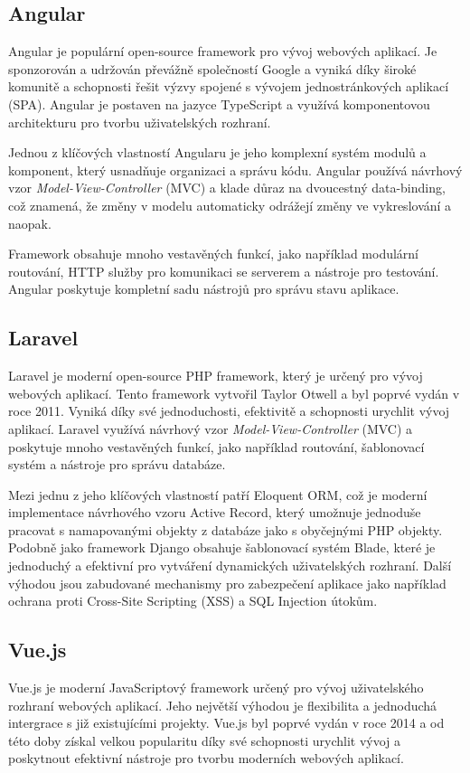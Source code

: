 \subsection{Angular}
\label{subsec:dev-framework-angular}
Angular je populární open-source framework pro vývoj webových aplikací. Je sponzorován a udržován převážně společností Google a vyniká díky široké komunitě a schopnosti řešit výzvy spojené s vývojem jednostránkových aplikací (SPA). Angular je postaven na jazyce TypeScript a využívá komponentovou architekturu pro tvorbu uživatelských rozhraní.

Jednou z klíčových vlastností Angularu je jeho komplexní systém modulů a komponent, který usnadňuje organizaci a správu kódu. Angular používá návrhový vzor \textit{Model-View-Controller} (MVC) a klade důraz na dvoucestný data-binding, což znamená, že změny v modelu automaticky odrážejí změny ve vykreslování a naopak.

Framework obsahuje mnoho vestavěných funkcí, jako například modulární routování, HTTP služby pro komunikaci se serverem a nástroje pro testování. Angular poskytuje kompletní sadu nástrojů pro správu stavu aplikace. \cite{about_angular}

\subsection{Laravel}
\label{subsec:dev-framework-laravel}
Laravel je moderní open-source PHP framework, který je určený pro vývoj webových aplikací. Tento framework vytvořil Taylor Otwell a byl poprvé vydán v roce 2011. Vyniká díky své jednoduchosti, efektivitě a schopnosti urychlit vývoj aplikací. Laravel využívá návrhový vzor \textit{Model-View-Controller} (MVC) a poskytuje mnoho vestavěných funkcí, jako například routování, šablonovací systém a nástroje pro správu databáze.

Mezi jednu z jeho klíčových vlastností patří Eloquent ORM, což je moderní implementace návrhového vzoru Active Record, který umožnuje jednoduše pracovat s namapovanými objekty z databáze jako s obyčejnými PHP objekty. Podobně jako framework Django obsahuje šablonovací systém Blade, které je jednoduchý a efektivní pro vytváření dynamických uživatelských rozhraní. Další výhodou jsou zabudované mechanismy pro zabezpečení aplikace jako například ochrana proti Cross-Site Scripting (XSS) a SQL Injection útokům. \cite{about_laravel}

\subsection{Vue.js}
\label{subsec:dev-framework-vuejs}
Vue.js je moderní JavaScriptový framework určený pro vývoj uživatelského rozhraní webových aplikací. Jeho největší výhodou je flexibilita a jednoduchá intergrace s již existujícími projekty. Vue.js byl poprvé vydán v roce 2014 a od této doby získal velkou popularitu díky své schopnosti urychlit vývoj a poskytnout efektivní nástroje pro tvorbu moderních webových aplikací.

